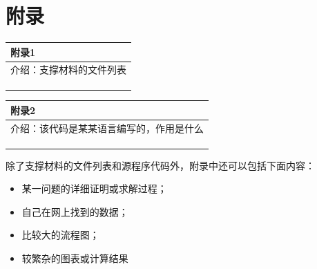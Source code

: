 \documentclass{my_paper}
\begin{document}
\begin{center}
\end{center}

\newpage
\section{附录}

\begin{table}[htbp]
    \centering
    \begin{tabular}{|p{14.0cm}|}
    \hline
    \textbf{附录1} \\ %
    \hline
    介绍：支撑材料的文件列表  \\ 
    \\
    \\
    \\
    \hline
    \end{tabular}
\end{table}

\begin{table}[htbp]
    \centering
    \begin{tabular}{|p{14.0cm}|}
    \hline
    \textbf{附录2} \\ %
    \hline
    介绍：该代码是某某语言编写的，作用是什么   \\ 
    \\
    \\
    \\
    \hline
    \end{tabular}
\end{table}

除了支撑材料的文件列表和源程序代码外，附录中还可以包括下面内容：
\begin{itemize}
\item 某一问题的详细证明或求解过程；
\item 自己在网上找到的数据；
\item 比较大的流程图；
\item 较繁杂的图表或计算结果
\end{itemize}
\end{document}
